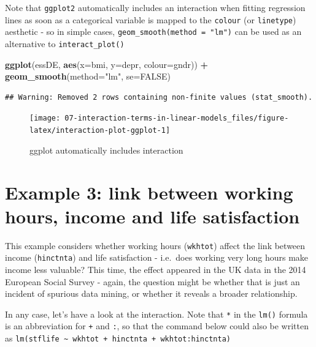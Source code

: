 \documentclass[
]{book}
\newenvironment{Shaded}{\begin{snugshade}}{\end{snugshade}}
\newcommand{\DataTypeTok}[1]{\textcolor[rgb]{0.13,0.29,0.53}{#1}}
\newcommand{\KeywordTok}[1]{\textcolor[rgb]{0.13,0.29,0.53}{\textbf{#1}}}
\newcommand{\NormalTok}[1]{#1}
\newcommand{\OperatorTok}[1]{\textcolor[rgb]{0.81,0.36,0.00}{\textbf{#1}}}
\newcommand{\OtherTok}[1]{\textcolor[rgb]{0.56,0.35,0.01}{#1}}
\newcommand{\StringTok}[1]{\textcolor[rgb]{0.31,0.60,0.02}{#1}}
\begin{document}
Note that \texttt{ggplot2} automatically includes an interaction when fitting regression lines as soon as a categorical variable is mapped to the \texttt{colour} (or \texttt{linetype}) aesthetic - so in simple cases, \texttt{geom\_smooth(method\ =\ "lm")} can be used as an alternative to \texttt{interact\_plot()}

\begin{Shaded}
\begin{Highlighting}[]
\KeywordTok{ggplot}\NormalTok{(essDE, }\KeywordTok{aes}\NormalTok{(}\DataTypeTok{x=}\NormalTok{bmi, }\DataTypeTok{y=}\NormalTok{depr, }\DataTypeTok{colour=}\NormalTok{gndr)) }\OperatorTok{+}\StringTok{ }\KeywordTok{geom_smooth}\NormalTok{(}\DataTypeTok{method=}\StringTok{"lm"}\NormalTok{, }\DataTypeTok{se=}\OtherTok{FALSE}\NormalTok{)}
\end{Highlighting}
\end{Shaded}

\begin{verbatim}
## Warning: Removed 2 rows containing non-finite values (stat_smooth).
\end{verbatim}

\begin{figure}

{\centering \texttt{[image: 07-interaction-terms-in-linear-models\_files/figure-latex/interaction-plot-ggplot-1]} 

}

\caption{ggplot automatically includes interaction}\label{fig:interaction-plot-ggplot}
\end{figure}

\hypertarget{example-3-link-between-working-hours-income-and-life-satisfaction}{%
\section{Example 3: link between working hours, income and life satisfaction}\label{example-3-link-between-working-hours-income-and-life-satisfaction}}

This example considers whether working hours (\texttt{wkhtot}) affect the link between income (\texttt{hinctnta}) and life satisfaction - i.e.~does working very long hours make income less valuable? This time, the effect appeared in the UK data in the 2014 European Social Survey - again, the question might be whether that is just an incident of spurious data mining, or whether it reveals a broader relationship.

In any case, let's have a look at the interaction. Note that \texttt{*} in the \texttt{lm()} formula is an abbreviation for \texttt{+} and \texttt{:}, so that the command below could also be written as \texttt{lm(stflife\ \textasciitilde{}\ wkhtot\ +\ hinctnta\ +\ wkhtot:hinctnta)}
\end{document}
